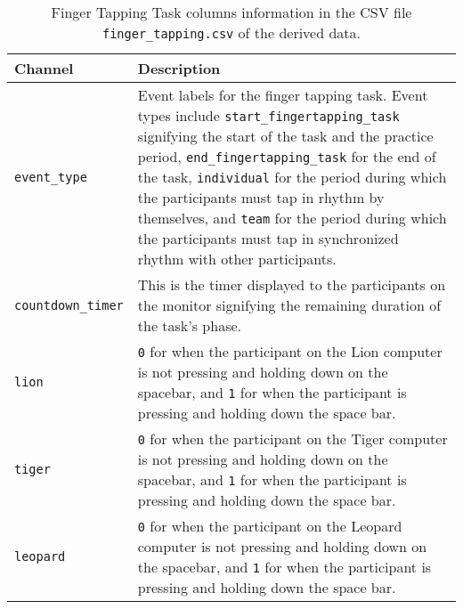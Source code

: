 \begin{table}[h]
\centering
\begin{tabularx}{\textwidth}{|l|X|}
\hline
\textbf{Channel} & \textbf{Description} \\
\hline
\texttt{event\_type} & Event labels for the finger tapping task. Event types include \texttt{start\_fingertapping\_task} signifying the start of the task and the practice period, \texttt{end\_fingertapping\_task} for the end of the task, \texttt{individual} for the period during which the participants must tap in rhythm by themselves, and \texttt{team} for the period during which the participants must tap in synchronized rhythm with other participants.\\
\hline
\texttt{countdown\_timer} & This is the timer displayed to the participants on the monitor signifying the remaining duration of the task's phase.\\
\hline
\texttt{lion} & \texttt{0} for when the participant on the Lion computer is not pressing and holding down on the spacebar, and \texttt{1} for when the participant is pressing and holding down the space bar.\\
\hline
\texttt{tiger} & \texttt{0} for when the participant on the Tiger computer is not pressing and holding down on the spacebar, and \texttt{1} for when the participant is pressing and holding down the space bar.\\
\hline
\texttt{leopard} & \texttt{0} for when the participant on the Leopard computer is not pressing and holding down on the spacebar, and \texttt{1} for when the participant is pressing and holding down the space bar.\\
\hline
\end{tabularx}
\caption{Finger Tapping Task columns information in the CSV file \texttt{finger\_tapping.csv} of the derived data.}
\label{tab:finger_task_columns}
\end{table}

